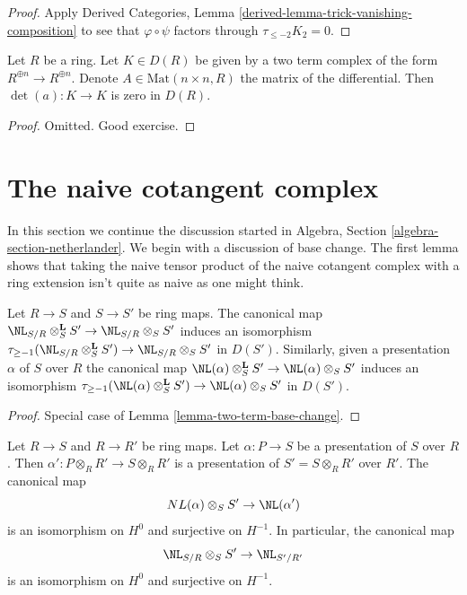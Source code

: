 \begin{proof}
Apply Derived Categories, Lemma \ref{derived-lemma-trick-vanishing-composition}
to see that $\varphi \circ \psi$ factors through $\tau_{\leq -2}K_2 = 0$.
\end{proof}

\begin{lemma}
\label{lemma-silly}
Let $R$ be a ring. Let $K \in D(R)$ be given by a two term complex
of the form $R^{\oplus n} \to R^{\oplus n}$. Denote
$A \in \text{Mat}(n \times n, R)$ the matrix of the differential.
Then $\det(a) : K \to K$ is zero in $D(R)$.
\end{lemma}

\begin{proof}
Omitted. Good exercise.
\end{proof}






\section{The naive cotangent complex}
\label{section-netherlander}

\noindent
In this section we continue the discussion started in
Algebra, Section \ref{algebra-section-netherlander}.
We begin with a discussion of base change.
The first lemma shows that taking the naive tensor product
of the naive cotangent complex with a ring extension
isn't quite as naive as one might think.

\begin{lemma}
\label{lemma-tensor-NL}
Let $R \to S$ and $S \to S'$ be ring maps. The canonical map
$\NL_{S/R} \otimes_S^\mathbf{L} S' \to \NL_{S/R} \otimes_S S'$
induces an isomorphism
$\tau_{\geq -1}(\NL_{S/R} \otimes_S^\mathbf{L} S') \to \NL_{S/R} \otimes_S S'$
in $D(S')$. Similarly, given a presentation $\alpha$ of $S$ over $R$
the canonical map
$\NL(\alpha) \otimes_S^\mathbf{L} S' \to \NL(\alpha) \otimes_S S'$
induces an isomorphism $\tau_{\geq -1}(\NL(\alpha) \otimes_S^\mathbf{L} S') \to
\NL(\alpha) \otimes_S S'$ in $D(S')$.
\end{lemma}

\begin{proof}
Special case of Lemma \ref{lemma-two-term-base-change}.
\end{proof}

\begin{lemma}
\label{lemma-base-change-NL}
Let $R \to S$ and $R \to R'$ be ring maps.
Let $\alpha : P \to S$ be a presentation of $S$ over $R$.
Then $\alpha' : P \otimes_R R' \to S \otimes_R R'$ is a
presentation of $S' = S \otimes_R R'$ over $R'$.
The canonical map
$$
NL(\alpha) \otimes_S S' \to \NL(\alpha')
$$
is an isomorphism on $H^0$ and surjective on $H^{-1}$. In particular,
the canonical map
$$
\NL_{S/R} \otimes_S S' \to \NL_{S'/R'}
$$
is an isomorphism on $H^0$ and surjective on $H^{-1}$.
\end{lemma}

